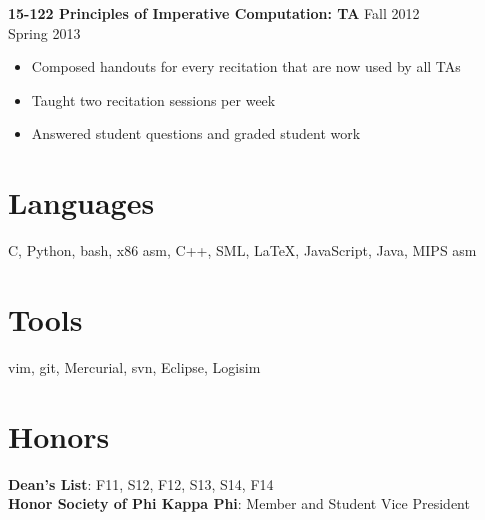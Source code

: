 \documentclass[margin]{res}
\begin{document}
\begin{resume}
  \textbf{15-122 Principles of Imperative Computation: TA}
    \hfill Fall 2012\\ \hphantom{1em} \hfill Spring 2013

  \vspace{-1em}\vspace{-1ex}
  \begin{itemize} \itemsep -2pt
    \item Composed handouts for every recitation that are now used by all TAs
    \item Taught two recitation sessions per week
    \item Answered student questions and graded student work
  \end{itemize}

\section{Languages}
  C, Python, bash, x86 asm, C++, SML, \LaTeX, JavaScript, Java, MIPS asm

\section{Tools}
  vim, git, Mercurial, svn, Eclipse, Logisim

\section{Honors}
  \textbf{Dean's List}: F11, S12, F12, S13, S14, F14 \\
  \textbf{Honor Society of Phi Kappa Phi}: Member and Student Vice President
\end{resume}
\end{document}
